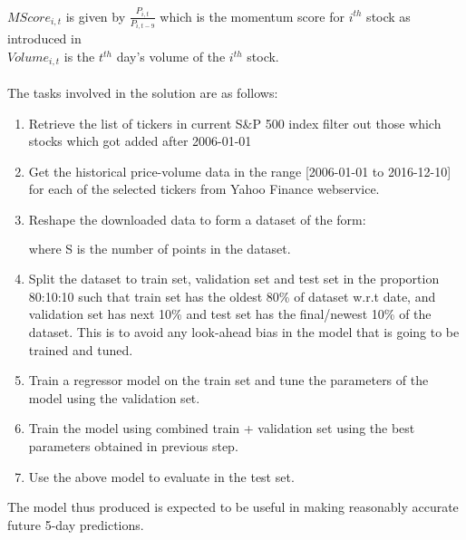 \documentclass[10pt]{report}
\begin{document}
$MScore_{i,t}$ is given by $\frac{P_{i,t}}{P_{i, t-9}}$ which is the momentum score for $i^{th}$ stock as introduced in \cite{mlfortrading}\\
$Volume_{i,t}$ is the $t^{th}$ day's volume of the $i^{th}$ stock.\\
\\
The tasks involved in the solution are as follows:
\begin{enumerate}
\item Retrieve the list of tickers in current S\&P 500 index filter out those which stocks which got added after 2006-01-01
\item Get the historical price-volume data in the range [2006-01-01 to 2016-12-10] for each of the selected tickers from Yahoo Finance webservice.
\item Reshape the downloaded data to form a dataset of the form: 
\begin{align*}
[&(feature_1, feature_2, ..., feature_n, target)_{t=0},\\
 &(feature_1, feature_2, ..., feature_n, target)_{t=1},\\
 &...\\
 &(feature_1, feature_2, ..., feature_n, target)_{t=S}]\\
\end{align*} where S is the number of points in the dataset.
\item Split the dataset to train set, validation set and test set in the proportion 80:10:10 such that train set has the oldest 80\% of dataset w.r.t date, and validation set has next 10\% and test set has the final/newest 10\% of the dataset. This is to avoid any look-ahead bias in the model that is going to be trained and tuned.
\item Train a regressor model on the train set and tune the parameters of the model using the validation set.
\item Train the model using combined train + validation set using the best parameters obtained in previous step.
\item Use the above model to evaluate in the test set.
\end{enumerate}
The model thus produced is expected to be useful in making reasonably accurate future 5-day predictions.
\end{document}

